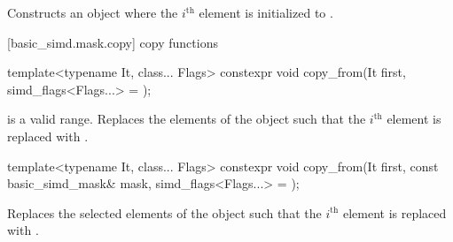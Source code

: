 \begin{itemdescr}
  \MaskLoadDescr
    {\validMaskedRange}
    {Constructs an object where the $i^\text{th}$ element is initialized to  \foralli.}
\end{itemdescr}

[basic_simd.mask.copy]{ copy functions}

\begin{itemdecl}
template<typename It, class... Flags>
  constexpr void copy_from(It first, simd_flags<Flags...> = {});
\end{itemdecl}

\begin{itemdescr}
  \MaskLoadDescr
  {\tcode{[first, first + size())} is a valid range.}
  {Replaces the elements of the  object such that the $i^\text{th}$ element is replaced with  \foralli.}
\end{itemdescr}

\begin{itemdecl}
template<typename It, class... Flags>
  constexpr void copy_from(It first, const basic_simd_mask& mask, simd_flags<Flags...> = {});
\end{itemdecl}

\begin{itemdescr}
  \MaskLoadDescr
    {\validMaskedRange}
    {Replaces the selected elements of the  object such that the $i^\text{th}$ element is replaced with  \forallmaskedi.}
\end{itemdescr}

\newcommand\MaskStoreDescr[2]{
  \pnum\constraints
  \begin{itemize}
    \item \tcode{is_simd_flag_type_v<Flags>} is \tcode{true}, and
    \item \tcode{iter_value_t<Out>} is of type \tcode{bool}, and
    \item \tcode{Out} satisfies \tcode{contiguous_iterator}, and
    \item \tcode{Out} satisfies \tcode{output_iterator<value_type>}.
  \end{itemize}

  \pnum\expects
  \begin{itemize}
    \item #1
    \item \tcode{Out} models \tcode{contiguous_iterator}.
    \item \tcode{Out} models \tcode{output_iterator<value_type>}.
    \flagsRequires{basic_simd_mask}{value_type}
  \end{itemize}

  \pnum\effects #2

  \pnum\throws Nothing.
}


